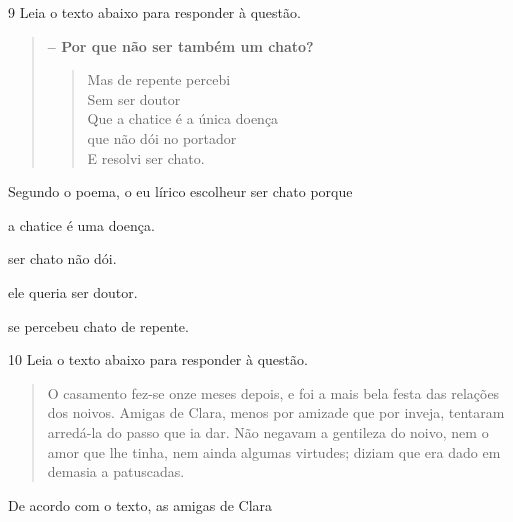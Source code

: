 \num{9} Leia o texto abaixo para responder à questão. 

\begin{quote}

\textbf{-- Por que não ser também um chato?}

\begin{verse}

Mas de repente percebi \\
Sem ser doutor \\
Que a chatice é a única doença \\
que não dói no portador \\
E resolvi ser chato. 

\end{verse}
\end{quote}


Segundo o poema, o eu lírico escolheur ser chato porque 

\begin{escolha}

  \item a chatice é uma doença.
  
  \item ser chato não dói.
  
  \item ele queria ser doutor.
  
  \item se percebeu chato de repente.

\end{escolha}

\num{10} Leia o texto abaixo para responder à questão. 

\begin{quote}

O casamento fez-se onze meses depois, e foi a mais bela festa das
relações dos noivos. Amigas de Clara, menos por amizade que por
inveja, tentaram arredá-la do passo que ia dar. Não negavam a gentileza
do noivo, nem o amor que lhe tinha, nem ainda algumas virtudes; diziam
que era dado em demasia a patuscadas.

\end{quote}


De acordo com o texto, as amigas de Clara

